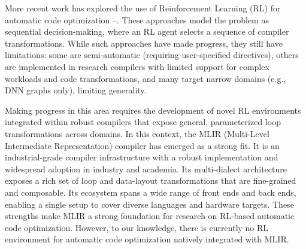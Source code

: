 \documentclass[10pt,twocolumn]{article}
\begin{document}
More recent work has explored the use of Reinforcement Learning (RL) for automatic code optimization \cite{ref6}--\cite{ref11}. These approaches model the problem as sequential decision-making, where an RL agent selects a sequence of compiler transformations. While such approaches have made progress, they still have limitations: some are semi-automatic (requiring user-specified directives), others are implemented in research compilers with limited support for complex workloads and code transformations, and many target narrow domains (e.g., DNN graphs only), limiting generality.

Making progress in this area requires the development of novel RL environments integrated within robust compilers that expose general, parameterized loop transformations across domains. In this context, the MLIR (Multi-Level Intermediate Representation) compiler \cite{ref12} has emerged as a strong fit. It is an industrial-grade compiler infrastructure with a robust implementation and widespread adoption in industry and academia. Its multi-dialect architecture exposes a rich set of loop and data-layout transformations that are fine-grained and composable. Its ecosystem spans a wide range of front ends and back ends, enabling a single setup to cover diverse languages and hardware targets. These strengths make MLIR a strong foundation for research on RL-based automatic code optimization. However, to our knowledge, there is currently no RL environment for automatic code optimization natively integrated with MLIR.
\end{document}

